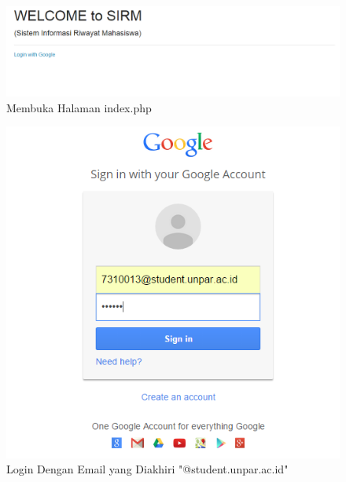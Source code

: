 \begin{figure}[H]
\centering
\includegraphics[scale=0.5]{Gambar/pengujian1.png}
\caption[Membuka Halaman index.php]{Membuka Halaman index.php} 
\label{fig:membukahalamanindex}
\end{figure}

\begin{figure}[H]
\centering
\includegraphics[scale=0.5]{Gambar/pengujian2.png}
\caption[Login Dengan Email yang Diakhiri "@student.unpar.ac.id"]{Login Dengan
Email yang Diakhiri "@student.unpar.ac.id"}
\label{fig:logindenganstudent}
\end{figure}

